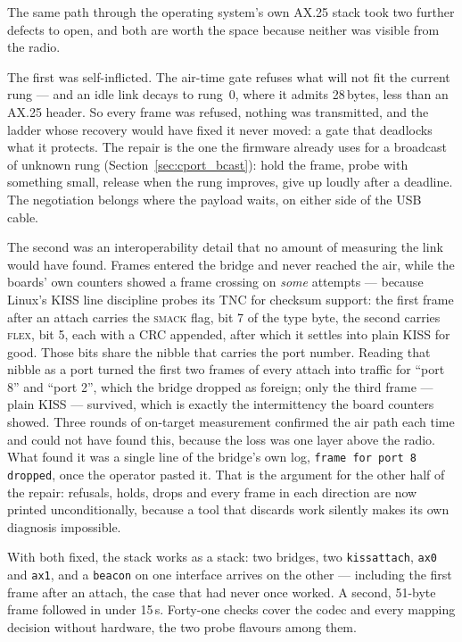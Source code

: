 The same path through the operating system's own AX.25 stack took two
further defects to open, and both are worth the space because neither
was visible from the radio.

The first was self-inflicted.  The air-time gate refuses what will not
fit the current rung --- and an idle link decays to rung~0, where it
admits 28\,bytes, less than an AX.25 header.  So every frame was
refused, nothing was transmitted, and the ladder whose recovery would
have fixed it never moved: a gate that deadlocks what it protects.  The
repair is the one the firmware already uses for a broadcast of unknown
rung (Section~\ref{sec:cport_bcast}): hold the frame, probe with
something small, release when the rung improves, give up loudly after a
deadline.  The negotiation belongs where the payload waits, on either
side of the USB cable.

The second was an interoperability detail that no amount of measuring
the link would have found.  Frames entered the bridge and never reached
the air, while the boards' own counters showed a frame crossing on
\emph{some} attempts --- because Linux's KISS line discipline probes
its TNC for checksum support: the first frame after an attach carries
the \textsc{smack} flag, bit 7 of the type byte, the second carries
\textsc{flex}, bit 5, each with a CRC appended, after which it settles
into plain KISS for good.  Those bits share the nibble that carries the
port number.  Reading that nibble as a port turned the first two frames
of every attach into traffic for ``port 8'' and ``port 2'', which the
bridge dropped as foreign; only the third frame --- plain KISS ---
survived, which is exactly the intermittency the board counters showed.
Three rounds of on-target measurement confirmed the air path each time
and could not have found this, because the loss was one layer above the
radio.  What found it was a single line of the bridge's own log,
\texttt{frame for port 8 dropped}, once the operator pasted it.  That
is the argument for the other half of the repair: refusals, holds,
drops and every frame in each direction are now printed
unconditionally, because a tool that discards work silently makes its
own diagnosis impossible.

With both fixed, the stack works as a stack: two bridges, two
\texttt{kissattach}, \texttt{ax0} and \texttt{ax1}, and a
\texttt{beacon} on one interface arrives on the other --- including the
first frame after an attach, the case that had never once worked.  A
second, 51-byte frame followed in under 15\,s.  Forty-one checks cover
the codec and every mapping decision without hardware, the two probe
flavours among them.

